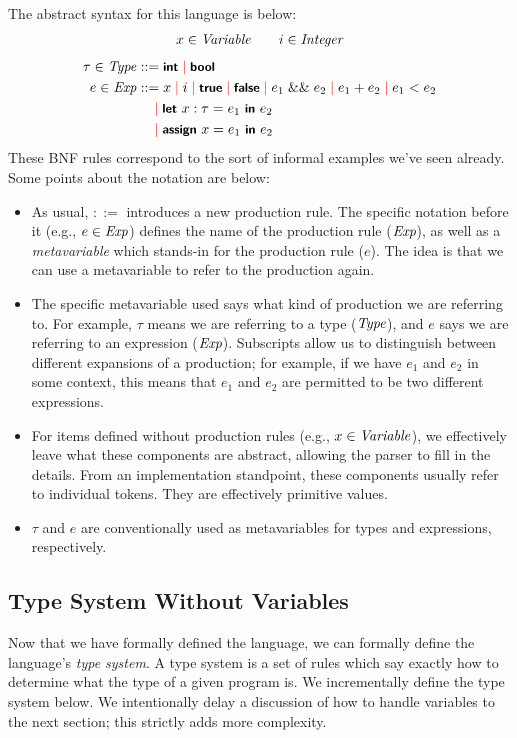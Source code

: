 The abstract syntax for this language is below:
\begin{gather*}
  x \in \mathit{Variable} \qquad i \in \mathit{Integer}
\end{gather*}
\begin{align*}
  \tau \in \mathit{Type} &::= \mbox{\sffamily{\bfseries\small {int}}} \; {\color{red}\mid}\; \mbox{\sffamily{\bfseries\small {bool}}}\\
  e \in \mathit{Exp} &::= x \; {\color{red}\mid}\; i \; {\color{red}\mid}\; \mbox{\sffamily{\bfseries\small {true}}} \; {\color{red}\mid}\; \mbox{\sffamily{\bfseries\small {false}}} \; {\color{red}\mid}\; e_1 \;\&\&\; e_2 \; {\color{red}\mid}\; e_1 + e_2 \; {\color{red}\mid}\; e_1 < e_2\\
  &\ \ \ \; {\color{red}\mid}\; \mbox{\sffamily{\bfseries\small {let }}} x: \tau = e_1 \mbox{\sffamily{\bfseries\small { in }}} e_2\\
  &\ \ \ \; {\color{red}\mid}\; \mbox{\sffamily{\bfseries\small {assign }}} x = e_1 \mbox{\sffamily{\bfseries\small { in }}} e_2
\end{align*}
These BNF rules correspond to the sort of informal examples we've seen already.
Some points about the notation are below:
\begin{itemize}
\item As usual, $::=$ introduces a new production rule.
  The specific notation before it (e.g., $e \in \mathit{Exp}$) defines the name of the production rule ($\mathit{Exp}$), as well as a \emph{metavariable} which stands-in for the production rule ($e$).
  The idea is that we can use a metavariable to refer to the production again.
\item The specific metavariable used says what kind of production we are referring to.
  For example, $\tau$ means we are referring to a type ($\mathit{Type}$), and $e$ says we are referring to an expression ($\mathit{Exp}$).
  Subscripts allow us to distinguish between different expansions of a production; for example, if we have $e_1$ and $e_2$ in some context, this means that $e_1$ and $e_2$ are permitted to be two different expressions.
\item For items defined without production rules (e.g., $x \in \mathit{Variable}$), we effectively leave what these components are abstract, allowing the parser to fill in the details.
  From an implementation standpoint, these components usually refer to individual tokens.
  They are effectively primitive values.
\item $\tau$ and $e$ are conventionally used as metavariables for types and expressions, respectively.
\end{itemize}

\subsection{Type System Without Variables}
Now that we have formally defined the language, we can formally define the language's \emph{type system}.
A type system is a set of rules which say exactly how to determine what the type of a given program is.
We incrementally define the type system below.
We intentionally delay a discussion of how to handle variables to the next section; this strictly adds more complexity.

